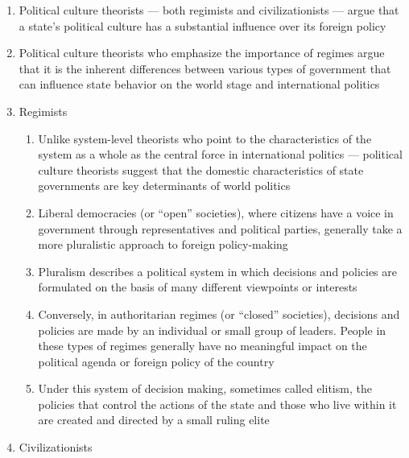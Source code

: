 \documentclass[12pt]{article}
\begin{document}
\begin{enumerate}
      \item Political culture theorists — both regimists and civilizationists — argue that a state's political culture has a substantial influence over its foreign policy

      \item Political culture theorists who emphasize the importance of regimes argue that it is the inherent differences between various types of government that can influence state behavior on the world stage and international politics

      \item Regimists

        \begin{enumerate}

          \item Unlike system-level theorists who point to the characteristics of the system as a whole as the central force in international politics — political culture theorists suggest that the domestic characteristics of state governments are key determinants of world politics

          \item Liberal democracies (or “open” societies), where citizens have a voice in government through representatives and political parties, generally take a more pluralistic approach to foreign policy-making

          \item Pluralism describes a political system in which decisions and policies are formulated on the basis of many different viewpoints or interests

          \item Conversely, in authoritarian regimes (or “closed” societies), decisions and policies are made by an individual or small group of leaders. People in these types of regimes generally have no meaningful impact on the political agenda or foreign policy of the country

          \item Under this system of decision making, sometimes called elitism, the policies that control the actions of the state and those who live within it are created and directed by a small ruling elite

        \end{enumerate}

      \item Civilizationists

        \begin{enumerate}


\end{enumerate}
\end{enumerate}
\end{document}
